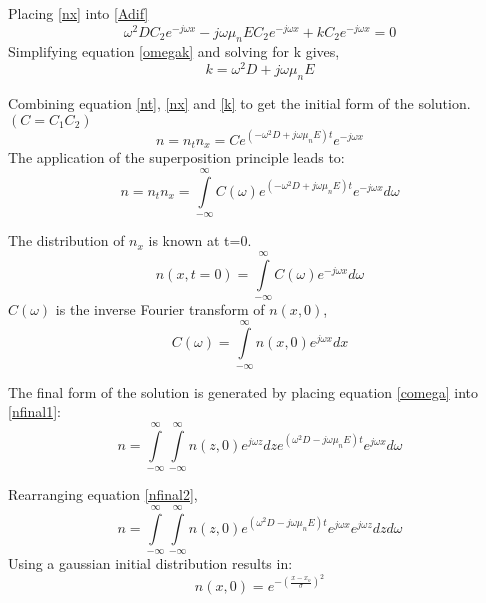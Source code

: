 \begin{doublespace}
Placing \eqref{nx} into \eqref{Adif} 
\begin{equation}
\omega^2 D C_2 e^{-j\omega x}-j\omega \mu_n E C_2 e^{-j\omega x}+kC_2e^{-j\omega x}=0
\label{omegak}
\end{equation}
Simplifying equation \eqref{omegak} and solving for k gives,
\begin{equation}
k=\omega^2 D+j\omega \mu_n E
\label{k}
\end{equation}

Combining equation \eqref{nt}, \eqref{nx} and \eqref{k} to get the initial form of the solution. $(C=C_1C_2)$
\begin{equation}
n=n_tn_x=Ce^{(-\omega^2 D + j\omega \mu_n E)t} e^{-j\omega x}
\end{equation}
The application of the superposition principle\cite{DifEq} leads to:
\begin{equation}
n=n_tn_x=\int\limits_{-\infty}^{\infty}C(\omega)e^{(-\omega^2 D + j\omega \mu_n E)t} e^{-j\omega x}d\omega
\label{nfinal1}
\end{equation}

The distribution of $n_x$ is known at t=0.
\begin{equation}
n(x,t=0)=\int\limits_{-\infty}^{\infty}C(\omega) e^{-j\omega x}d\omega
\end{equation}
$C(\omega)$ is  the inverse Fourier transform of $n(x,0)$,
\begin{equation}
C(\omega)=\int\limits_{-\infty}^{\infty}n(x,0)e^{j\omega x}dx
\label{comega}
\end{equation}

The final form of the solution is generated by placing equation \eqref{comega} into \eqref{nfinal1}:
\begin{equation}
n=\int\limits_{-\infty}^{\infty}\int\limits_{-\infty}^{\infty}n(z,0)e^{j\omega z}dz e^{(\omega ^2 D-j\omega \mu_n E)t}e^{j\omega x}d\omega
\label{nfinal2}
\end{equation}

Rearranging equation \eqref{nfinal2},
\begin{equation}
n=\int\limits_{-\infty}^{\infty}\int\limits_{-\infty}^{\infty}n(z,0) e^{(\omega ^2 D-j\omega \mu_n E)t}e^{j\omega x} e^{j\omega z}  dz d\omega
\end{equation}
Using a gaussian initial distribution results in:
\begin{equation}
n(x,0)=e^{- (\frac{x-x_o}{\sigma})^2}
\end{equation}


\end{doublespace}

